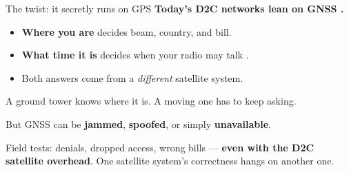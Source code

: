 \begin{frame}{The twist: it secretly runs on GPS}
  \large\textbf{Today's D2C networks lean on GNSS .}

  \vspace{0.5em}
  \small
  \begin{itemize}\itemsep5pt
    \item \textbf{Where you are} decides beam, country, and bill.
    \item \textbf{What time it is} decides when your radio may talk
      .
    \item Both answers come from a \emph{different} satellite system.
  \end{itemize}

  \vspace{0.3em}
  A ground tower knows where it is. A moving one has to keep asking.

  \vspace{0.3em}
  But GNSS can be \textbf{jammed}, \textbf{spoofed}, or simply
  \textbf{unavailable}.

     {Field tests: denials, dropped access, wrong bills ---
      \textbf{even with the D2C satellite overhead}. One satellite
      system's correctness hangs on another one.}

\end{frame}


